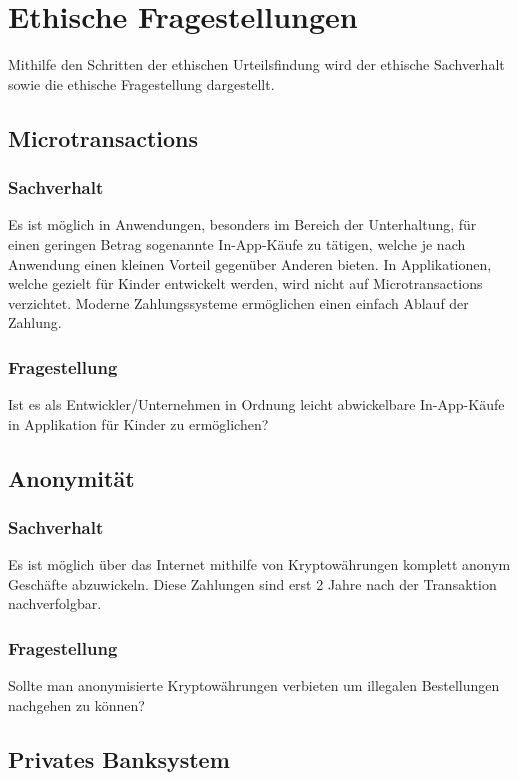 \section{Ethische Fragestellungen}
Mithilfe den Schritten der ethischen Urteilsfindung wird der ethische Sachverhalt sowie die ethische Fragestellung dargestellt.

\subsection{Microtransactions}
\subsubsection{Sachverhalt}
Es ist möglich in Anwendungen, besonders im Bereich der Unterhaltung, für einen geringen Betrag sogenannte In-App-Käufe zu tätigen, welche je nach Anwendung einen kleinen Vorteil gegenüber Anderen bieten. In Applikationen, welche gezielt für Kinder entwickelt werden, wird nicht auf Microtransactions verzichtet. Moderne Zahlungssysteme ermöglichen einen einfach Ablauf der Zahlung.

\subsubsection{Fragestellung}
Ist es als Entwickler/Unternehmen in Ordnung leicht abwickelbare In-App-Käufe in Applikation für Kinder zu ermöglichen?

\subsection{Anonymität}
\subsubsection{Sachverhalt}
Es ist möglich über das Internet mithilfe von Kryptowährungen komplett anonym Geschäfte abzuwickeln. Diese Zahlungen sind erst 2 Jahre nach der Transaktion nachverfolgbar. 

\subsubsection{Fragestellung}
Sollte man anonymisierte Kryptowährungen verbieten um illegalen Bestellungen nachgehen zu können?

\subsection{Privates Banksystem}
